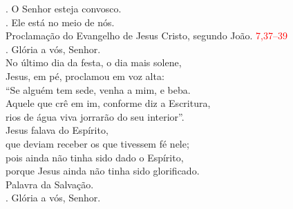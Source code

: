 \documentclass{book}
\begin{document}
\begin{flushleft}

    \vspace{0.2cm}
    {\color{red} \Vbar.} O Senhor esteja convosco. \\
    {\color{red} \Rbar.} Ele está no meio de nós.
    \vspace{0.1cm} \\
    {\color{red} \grecross} Proclamação do Evangelho de Jesus Cristo, segundo João.
    \hspace{\fill}
    \textcolor{red}{7,37--39} \\
    {\color{red} \Rbar.} Glória a vós, Senhor.
    \vspace{0.2cm} \\
    No último dia da festa, o dia mais solene, \\
    Jesus, em pé, proclamou em voz alta: \\
    ``Se alguém tem sede, venha a mim, e beba. \\
    Aquele que crê em im, conforme diz a Escritura, \\
    rios de água viva jorrarão do seu interior''. \\
    Jesus falava do Espírito, \\
    que deviam receber os que tivessem fé nele; \\
    pois ainda não tinha sido dado o Espírito, \\
    porque Jesus ainda não tinha sido glorificado.
    \vspace{0.1cm} \\
    Palavra da Salvação. \\
    {\color{red} \Rbar.} Glória a vós, Senhor.
    \vspace{0.2cm} \\

\end{flushleft}
\end{document}
